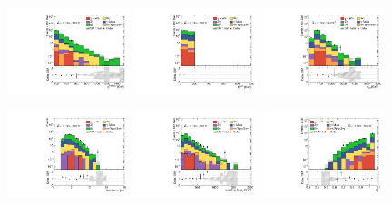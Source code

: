 \begin{figure}[ht!]
  \begin{center}

    \includegraphics[width=0.32\textwidth]{images_tmp/results/fr2/can_CRT_ph_pt0_afterFit.pdf}
    \includegraphics[width=0.32\textwidth]{images_tmp/results/fr2/can_CRT_met_et_afterFit.pdf}
    \includegraphics[width=0.32\textwidth]{images_tmp/results/fr2/can_CRT_meff_afterFit.pdf}

    \includegraphics[width=0.32\textwidth]{images_tmp/results/fr2/can_CRT_jet_n_afterFit}
    \includegraphics[width=0.32\textwidth]{images_tmp/results/fr2/can_CRT_jet_pt0_afterFit.pdf}
    \includegraphics[width=0.32\textwidth]{images_tmp/results/fr2/can_CRT_rt4_afterFit}


\end{center}
\end{figure}
